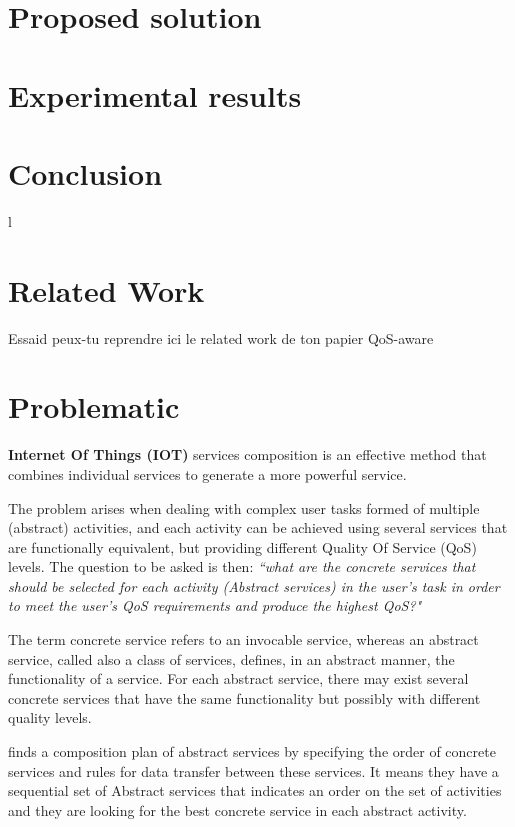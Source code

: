 \documentclass[10pt,journal,compsoc]{IEEEtran}
\begin{document}
  \section{Proposed solution}
  \section{Experimental results}

  \section{Conclusion}
  
  l  
  \newpage


\section{Related Work}
Essaid peux-tu reprendre ici le related work de ton papier QoS-aware 
\section{Problematic}

\textbf{Internet Of Things (IOT)} services composition is an effective method that combines individual services to generate a more powerful service. 

The problem arises when dealing with complex user tasks formed of multiple (abstract) activities, and each activity can be achieved using several services that are functionally equivalent, but providing different Quality Of Service (QoS) levels. The question to be asked is then:  \emph{``what are the concrete services that should be selected for each activity (Abstract services) in the user's task in order to meet the user's QoS requirements and produce the highest QoS?"}

The term concrete service refers to an invocable service, whereas an abstract service, called also a class of services, defines, in an abstract manner, the functionality of a service. For each abstract service, there may exist several concrete services that have the same functionality but possibly with different quality levels.  

\cite{DBLP:journals/tase/KhanoucheACKY16} finds a composition plan of abstract services by specifying the order of concrete services and rules for data transfer between these services. It means they have a sequential set of Abstract services that indicates an order on the set of activities and they are looking for the best concrete service in each abstract activity. 
\end{document}
